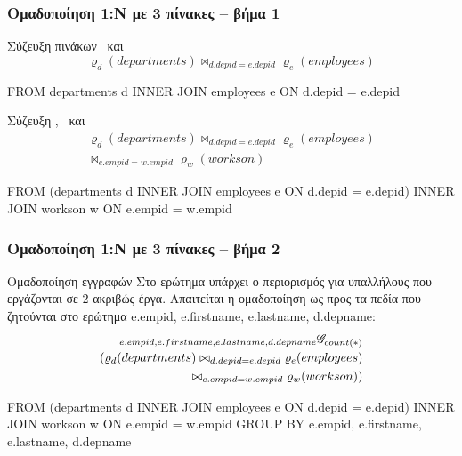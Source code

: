 \begin{frame}
\frametitle{Ομαδοποίηση 1:Ν με 3 πίνακες -- βήμα 1}
\begin{minipage}{\wE}
\vspace{-0.5cm}
  \begin{block}{\small Σύζευξη πινάκων \tdepartments\ και \temployees}
   \[
    \varrho_{d} (departments) \bowtie_{d.depid=e.depid} \varrho_{e} (employees)
   \]
\vspace{-0.5cm}
\en
\begin{SQL}
    FROM departments d INNER JOIN employees e
         ON d.depid = e.depid
\end{SQL}
\el
  \end{block}
  \pause
  \begin{block}{\small Σύζευξη \tdepartments, \temployees\ και \tworkson}
    \[
      \begin{split}
      \varrho_{d} (departments) \bowtie_{d.depid=e.depid} \varrho_{e} (employees)    \\
                                \bowtie_{e.empid=w.empid} \varrho_{w} (workson)     
      \end{split}
    \]
   \vspace{-0.5cm}
\en
\begin{SQL}
    FROM (departments d INNER JOIN employees e
                           ON d.depid = e.depid)
                        INNER JOIN workson w
                           ON e.empid = w.empid
\end{SQL}
\el
  \end{block}
\end{minipage}
\end{frame}



\begin{frame}
\frametitle{Ομαδοποίηση 1:Ν με 3 πίνακες -- βήμα 2}
\begin{minipage}{\wE}
\vspace{-0.5cm}
\begin{block}{\small Ομαδοποίηση εγγραφών}
Στο ερώτημα υπάρχει ο περιορισμός για υπαλλήλους που εργάζονται σε 2 ακριβώς έργα.
Απαιτείται η ομαδοποίηση ως προς τα πεδία που ζητούνται στο ερώτημα
{\ra e.empid, e.firstname, e.lastname, d.depname}:
\[
\begin{split}
  {}_{e.empid, e.firstname, e.lastname, d.depname}  \mathscr{G}_{count(*)} \\
  (
    \varrho_{d} (departments) \bowtie_{d.depid=e.depid} \varrho_{e} (employees) \\
                            \bowtie_{e.empid=w.empid} \varrho_{w} (workson)
  )
\end{split}
\]
\pause
\en
\begin{SQL}
    FROM (departments d INNER JOIN employees e
                           ON d.depid = e.depid)
                        INNER JOIN workson w
                           ON e.empid = w.empid
GROUP BY e.empid, e.firstname, e.lastname, d.depname
\end{SQL}
\el
\end{block}
\end{minipage}
\end{frame}



